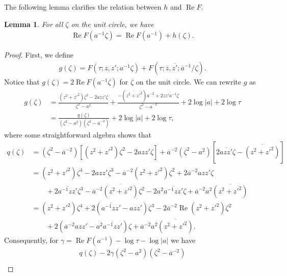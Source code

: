 \documentclass[%
 jmp,
cp,  %
 amsmath,amsthm,amssymb,%
 reprint,%
onecolumn]{revtex4-2}
\newtheorem{lemma}[theorem]{Lemma}
\begin{document}
The following lemma clarifies the relation between $h$ and $\operatorname{Re} F$. 

\begin{lemma} \label{lem:RFandhrelation}
For all $\zeta$ on the unit circle, we have
\begin{align}
\operatorname{Re} F(a^{-1} \zeta) = \operatorname{Re} F(a^{-1}) +  h(\zeta).
\end{align}
\end{lemma}

\begin{proof}
First, we define
\begin{align} \label{eq:defAuxg}
g(\zeta) = F\left(\tau;z,z';a^{-1}\zeta\right)+F\left(\tau;\overline z, \overline{z'}; \overline a^{-1}/\zeta\right).
\end{align}
Notice that $g(\zeta) = 2 \operatorname{Re} F(a^{-1}\zeta)$ for $\zeta$ on the unit circle. We can rewrite $g$ as
\begin{align*}
g(\zeta) &= \frac{(z^2+z'^2) \zeta^2 - 2 a z z' \zeta}{\zeta^2-a^2}
+ \frac{-(\overline{z^2+z'^2}) \overline a^{-2} + 2 \overline{z z' a^{-1}} \zeta}{\zeta^2-\overline a^{-2}} + 2\log|a| + 2\log\tau\\
&= \frac{q(\zeta)}{(\zeta^2-a^2)(\zeta^2-\overline a^{-2})} + 2\log|a| + 2 \log\tau,
\end{align*}
where some straightforward algebra shows that
\begin{align*}
q(\zeta) &= (\zeta^2-\overline a^{-2}) [(z^2+z'^2)\zeta^2 - 2 a z z' \zeta] + \overline a^{-2} (\zeta^2-a^2)[2 \overline{a z z'} \zeta - \overline{(z^2+z'^2)}]\\
&= (z^2+z'^2) \zeta^4 
- 2 a z z' \zeta^3
- \overline a^{-2} (z^2+z'^2) \zeta^2
+ 2 \overline a^{-2} a z z' \zeta\\
&\qquad + 2 \overline{a^{-1} z z'} \zeta^3
-  \overline a^{-2} \overline{(z^2+z'^2)} \zeta^2
- 2 a^2 \overline{a^{-1} z z'} \zeta
+ \overline a^{-2} a^2 \overline{(z^2+z'^2)}\\
&= (z^2+z'^2) \zeta^4 
+2(\overline{a^{-1} z z'} - a z z') \zeta^3
-2 \overline a^{-2} \operatorname{Re}(z^2+z'^2) \zeta^2\\
&\qquad + 2 (\overline a^{-2} a z z' - a^2 \overline{a^{-1} z z'}) \zeta
+ \overline a^{-2} a^2 \overline{(z^2+z'^2)}.
\end{align*}
Consequently, for $\gamma =  \operatorname{Re} F(a^{-1}) - \log\tau-\log|a|$ we have
\begin{multline*}
q(\zeta) - 2 \gamma  (\zeta^2-a^2) (\zeta^2-\overline a^{-2})\\

\end{multline*}
\end{proof}
\end{document}
